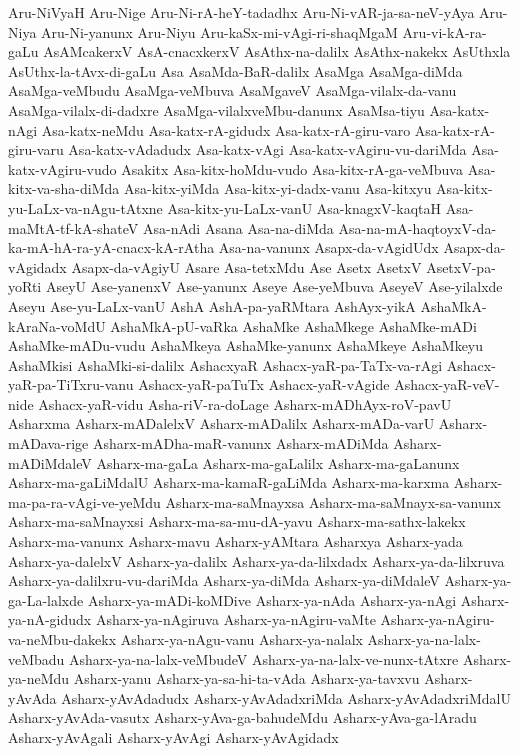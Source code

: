 {Aru-NiVyaH
Aru-Nige
Aru-Ni-rA-heY-tadadhx
Aru-Ni-vAR-ja-sa-neV-yAya
Aru-Niya
Aru-Ni-yanunx
Aru-Niyu
Aru-kaSx-mi-vAgi-ri-shaqMgaM
Aru-vi-kA-ra-gaLu
AsAMcakerxV
AsA-cnacxkerxV
AsAthx-na-dalilx
AsAthx-nakekx
AsUthxla
AsUthx-la-tAvx-di-gaLu
Asa
AsaMda-BaR-dalilx
AsaMga
AsaMga-diMda
AsaMga-veMbudu
AsaMga-veMbuva
AsaMgaveV
AsaMga-vilalx-da-vanu
AsaMga-vilalx-di-dadxre
AsaMga-vilalxveMbu-danunx
AsaMsa-tiyu
Asa-katx-nAgi
Asa-katx-neMdu
Asa-katx-rA-gidudx
Asa-katx-rA-giru-varo
Asa-katx-rA-giru-varu
Asa-katx-vAdadudx
Asa-katx-vAgi
Asa-katx-vAgiru-vu-dariMda
Asa-katx-vAgiru-vudo
Asakitx
Asa-kitx-hoMdu-vudo
Asa-kitx-rA-ga-veMbuva
Asa-kitx-va-sha-diMda
Asa-kitx-yiMda
Asa-kitx-yi-dadx-vanu
Asa-kitxyu
Asa-kitx-yu-LaLx-va-nAgu-tAtxne
Asa-kitx-yu-LaLx-vanU
Asa-knagxV-kaqtaH
Asa-maMtA-tf-kA-shateV
Asa-nAdi
Asana
Asa-na-diMda
Asa-na-mA-haqtoyxV-da-ka-mA-hA-ra-yA-cnacx-kA-rAtha
Asa-na-vanunx
Asapx-da-vAgidUdx
Asapx-da-vAgidadx
Asapx-da-vAgiyU
Asare
Asa-tetxMdu
Ase
Asetx
AsetxV
AsetxV-pa-yoRti
AseyU
Ase-yanenxV
Ase-yanunx
Aseye
Ase-yeMbuva
AseyeV
Ase-yilalxde
Aseyu
Ase-yu-LaLx-vanU
AshA
AshA-pa-yaRMtara
AshAyx-yikA
AshaMkA-kAraNa-voMdU
AshaMkA-pU-vaRka
AshaMke
AshaMkege
AshaMke-mADi
AshaMke-mADu-vudu
AshaMkeya
AshaMke-yanunx
AshaMkeye
AshaMkeyu
AshaMkisi
AshaMki-si-dalilx
AshacxyaR
Ashacx-yaR-pa-TaTx-va-rAgi
Ashacx-yaR-pa-TiTxru-vanu
Ashacx-yaR-paTuTx
Ashacx-yaR-vAgide
Ashacx-yaR-veV-nide
Ashacx-yaR-vidu
Asha-riV-ra-doLage
Asharx-mADhAyx-roV-pavU
Asharxma
Asharx-mADalelxV
Asharx-mADalilx
Asharx-mADa-varU
Asharx-mADava-rige
Asharx-mADha-maR-vanunx
Asharx-mADiMda
Asharx-mADiMdaleV
Asharx-ma-gaLa
Asharx-ma-gaLalilx
Asharx-ma-gaLanunx
Asharx-ma-gaLiMdalU
Asharx-ma-kamaR-gaLiMda
Asharx-ma-karxma
Asharx-ma-pa-ra-vAgi-ve-yeMdu
Asharx-ma-saMnayxsa
Asharx-ma-saMnayx-sa-vanunx
Asharx-ma-saMnayxsi
Asharx-ma-sa-mu-dA-yavu
Asharx-ma-sathx-lakekx
Asharx-ma-vanunx
Asharx-mavu
Asharx-yAMtara
Asharxya
Asharx-yada
Asharx-ya-dalelxV
Asharx-ya-dalilx
Asharx-ya-da-lilxdadx
Asharx-ya-da-lilxruva
Asharx-ya-dalilxru-vu-dariMda
Asharx-ya-diMda
Asharx-ya-diMdaleV
Asharx-ya-ga-La-lalxde
Asharx-ya-mADi-koMDive
Asharx-ya-nAda
Asharx-ya-nAgi
Asharx-ya-nA-gidudx
Asharx-ya-nAgiruva
Asharx-ya-nAgiru-vaMte
Asharx-ya-nAgiru-va-neMbu-dakekx
Asharx-ya-nAgu-vanu
Asharx-ya-nalalx
Asharx-ya-na-lalx-veMbadu
Asharx-ya-na-lalx-veMbudeV
Asharx-ya-na-lalx-ve-nunx-tAtxre
Asharx-ya-neMdu
Asharx-yanu
Asharx-ya-sa-hi-ta-vAda
Asharx-ya-tavxvu
Asharx-yAvAda
Asharx-yAvAdadudx
Asharx-yAvAdadxriMda
Asharx-yAvAdadxriMdalU
Asharx-yAvAda-vasutx
Asharx-yAva-ga-bahudeMdu
Asharx-yAva-ga-lAradu
Asharx-yAvAgali
Asharx-yAvAgi
Asharx-yAvAgidadx
}

